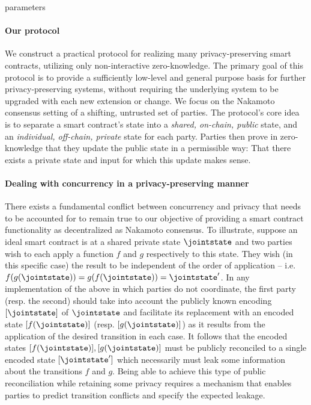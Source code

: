 {parameters}

\paragraph{Our protocol}

We construct a practical protocol for realizing many privacy-preserving smart
contracts, utilizing only non-interactive zero-knowledge. The
primary goal of this protocol is to provide a sufficiently low-level and
general purpose basis for further privacy-preserving systems,
without requiring the underlying system to be upgraded with each new extension or change.
We focus on the Nakamoto consensus setting of a shifting, untrusted set of
parties. The protocol's core idea is
to separate a smart contract's state into a \emph{shared, on-chain, public}
state, and an
\emph{individual, off-chain, private} state for each party. Parties then prove in
zero-knowledge that they update the public state in a permissible way: That
there exists a private state and input for which this update makes sense.

\paragraph{Dealing with concurrency in a privacy-preserving manner}
There exists a fundamental conflict between concurrency and privacy that needs
to be accounted for to remain true to our objective of providing a
smart contract functionality as decentralized as
Nakamoto consensus. To illustrate, suppose an ideal smart contract is at a
shared private state $\jointstate$ and two parties wish to each apply a function
$f$ and $g$ respectively to this state. They wish (in this specific case) the result to be independent of
the order of application -- i.e. $f(g(\jointstate)) = g(f(\jointstate)) = \jointstate'$. In any
implementation of the above in which parties do not coordinate, the first party (resp. the second) should take into account the
publicly known encoding $[\jointstate]$ of $\jointstate$ and facilitate its replacement
with an encoded state $[f(\jointstate)]$ (resp. $[g(\jointstate)]$) as it results from the
application of the desired transition in each case. It follows that the
encoded states $[f(\jointstate)], [g(\jointstate)]$ must be publicly reconciled to a
single encoded state $[\jointstate']$ which necessarily must leak some information
about the transitions $f$ and $g$. Being able to achieve this type of public
reconciliation while retaining some privacy requires a mechanism that enables
parties to predict transition conflicts and specify the expected leakage.
 
